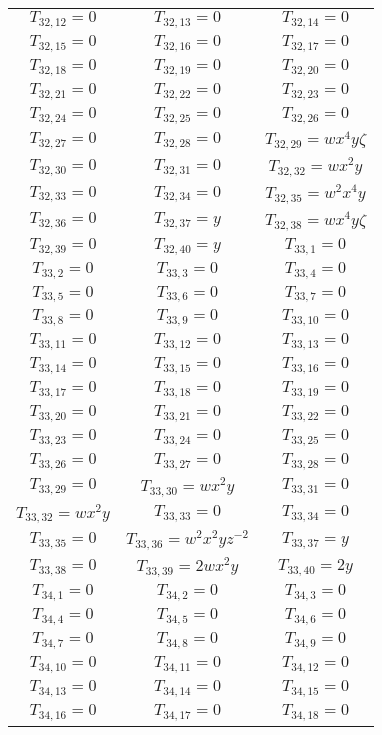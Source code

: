 \documentclass[12pt]{memoireuqam1.3}
\begin{document}
\begin{longtable}{|c|c|c|}
$T_{32,12}= 0$&
$T_{32,13}= 0$&
$T_{32,14}= 0$\\
$T_{32,15}= 0$&
$T_{32,16}= 0$&
$T_{32,17}= 0$\\
$T_{32,18}= 0$&
$T_{32,19}= 0$&
$T_{32,20}= 0$\\
$T_{32,21}= 0$&
$T_{32,22}= 0$&
$T_{32,23}= 0$\\
$T_{32,24}= 0$&
$T_{32,25}= 0$&
$T_{32,26}= 0$\\
$T_{32,27}= 0$&
$T_{32,28}= 0$&
$T_{32,29}= wx^4y\zeta$\\
$T_{32,30}= 0$&
$T_{32,31}= 0$&
$T_{32,32}= wx^2y$\\
$T_{32,33}= 0$&
$T_{32,34}= 0$&
$T_{32,35}= w^2x^4y$\\
$T_{32,36}= 0$&
$T_{32,37}= y$&
$T_{32,38}= wx^4y\zeta$\\
$T_{32,39}= 0$&
$T_{32,40}= y$&
$T_{33,1}= 0$\\
$T_{33,2}= 0$&
$T_{33,3}= 0$&
$T_{33,4}= 0$\\
$T_{33,5}= 0$&
$T_{33,6}= 0$&
$T_{33,7}= 0$\\
$T_{33,8}= 0$&
$T_{33,9}= 0$&
$T_{33,10}= 0$\\
$T_{33,11}= 0$&
$T_{33,12}= 0$&
$T_{33,13}= 0$\\
$T_{33,14}= 0$&
$T_{33,15}= 0$&
$T_{33,16}= 0$\\
$T_{33,17}= 0$&
$T_{33,18}= 0$&
$T_{33,19}= 0$\\
$T_{33,20}= 0$&
$T_{33,21}= 0$&
$T_{33,22}= 0$\\
$T_{33,23}= 0$&
$T_{33,24}= 0$&
$T_{33,25}= 0$\\
$T_{33,26}= 0$&
$T_{33,27}= 0$&
$T_{33,28}= 0$\\
$T_{33,29}= 0$&
$T_{33,30}= wx^2y$&
$T_{33,31}= 0$\\
$T_{33,32}= wx^2y$&
$T_{33,33}= 0$&
$T_{33,34}= 0$\\
$T_{33,35}= 0$&
$T_{33,36}= w^2x^2yz^{-2}$&
$T_{33,37}= y$\\
$T_{33,38}= 0$&
$T_{33,39}= 2wx^2y$&
$T_{33,40}= 2y$\\
$T_{34,1}= 0$&
$T_{34,2}= 0$&
$T_{34,3}= 0$\\
$T_{34,4}= 0$&
$T_{34,5}= 0$&
$T_{34,6}= 0$\\
$T_{34,7}= 0$&
$T_{34,8}= 0$&
$T_{34,9}= 0$\\
$T_{34,10}= 0$&
$T_{34,11}= 0$&
$T_{34,12}= 0$\\
$T_{34,13}= 0$&
$T_{34,14}= 0$&
$T_{34,15}= 0$\\
$T_{34,16}= 0$&
$T_{34,17}= 0$&
$T_{34,18}= 0$\\

\end{longtable}
\end{document}
